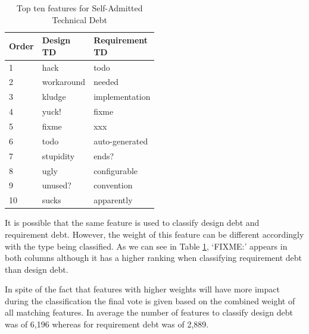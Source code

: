 \begin{table}[!hbt]
    \begin{center}
        \caption{Top ten features for Self-Admitted Technical Debt}
        \label{tbl:top_ten_features}
        \begin{tabular}{l| l l }
        \toprule
        \textbf{Order} & \thead{Design\\TD} & \thead{Requirement\\TD}  \\
        \midrule
         1  & hack       &   todo              \\
         2  & workaround &   needed            \\
         3  & kludge     &   implementation    \\
         4  & yuck!      &   fixme             \\
         5  & fixme      &   xxx               \\
         6  & todo       &   auto-generated    \\
         7  & stupidity  &   ends?             \\
         8  & ugly       &   configurable      \\
         9  & unused?    &   convention        \\
         10 & sucks      &   apparently        \\
        \bottomrule
        \end{tabular}
    \end{center}    
\end{table}

It is possible that the same feature is used to classify design debt and requirement debt. However, the weight of this feature can be different accordingly with the type being classified. As we can see in Table \ref{tbl:top_ten_features}, `FIXME:' appears in both columns although it has a higher ranking when classifying requirement debt than design debt. 

In spite of the fact that features with higher weights will have more impact during the classification the final vote is given based on the combined weight of all matching features. In average the number of features to classify design debt was of 6,196 whereas for requirement debt was of 2,889.


